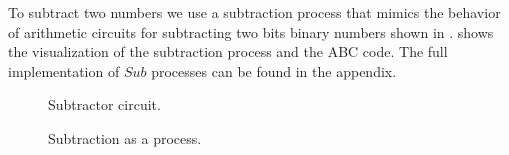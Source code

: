 To subtract two numbers we use a subtraction process that mimics the behavior of arithmetic circuits for subtracting two bits binary numbers shown in 
.
 shows the visualization of the subtraction process and the ABC code.
The full implementation of $Sub$ processes can be found in the appendix.
\begin{figure}[H]%
\centering
{}
\caption{Subtractor circuit.}
\label{tra_subtract_circuit}%
\end{figure}
\begin{figure}[H]%
\centering
{}%
\hspace{1em}%
%
\vspace{2em}
%
\caption{Subtraction as a process.}
\label{tra_subttraction}%
\end{figure}
